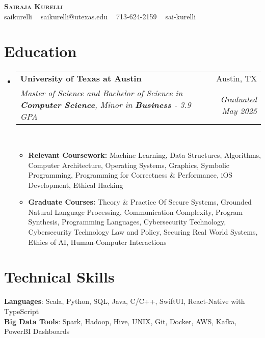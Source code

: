 \documentclass[letterpaper,11pt]{article}
\makeatletter
\newcommand{\resumeItem}[1]{
  \item\small{
    {#1 \vspace{-2pt}}
  }
}
\newcommand{\resumeSubLineheading}[6]{
  \vspace{-2pt}\item
    \begin{tabular*}{0.97\textwidth}[t]{l@{\extracolsep{\fill}}r}
      \textbf{#1} & #2 \\
      \textit{\small#3} & \textit{\small #5} \\
    \end{tabular*}\vspace{-7pt}
}
\newcommand{\resumeSubHeadingListStart}{\begin{itemize}[leftmargin=0.15in, label={}]}
\newcommand{\resumeSubHeadingListEnd}{\end{itemize}}
\newcommand{\resumeItemListStart}{\begin{itemize}}
\newcommand{\resumeItemListEnd}{\end{itemize}\vspace{-5pt}}
\makeatother
\begin{document}

\begin{center}
  \textbf{\huge \scshape Sairaja Kurelli} \\ \vspace{3pt}
  \small \faGithub{} saikurelli $\;\;$ \faEnvelope{} saikurelli@utexas.edu $\;\;$ \faPhone{} 713-624-2159 $\;\;$\faLinkedin{} sai-kurelli
\end{center}


\section{Education}
\resumeSubHeadingListStart
\resumeSubLineheading
{University of Texas at Austin}{Austin, TX}
{Master of Science and Bachelor of Science in \textbf{Computer Science}, Minor in \textbf{Business} - 3.9 GPA}
{}{Graduated May 2025} {}
\\
\resumeItemListStart
\resumeItem{\small \textbf{Relevant Coursework:} Machine Learning, Data Structures, Algorithms,
  Computer Architecture, Operating Systems, Graphics, Symbolic Programming, Programming for Correctness \& Performance,
  iOS Development, Ethical Hacking} %
\resumeItem{\small \textbf{Graduate Courses:} Theory \& Practice Of Secure Systems, Grounded Natural Language Processing, Communication Complexity, Program Synthesis, Programming Languages, Cybersecurity Technology, Cybersecurity Technology Law and Policy, Securing Real World Systems, Ethics of AI, Human-Computer Interactions}
\resumeItemListEnd
\resumeSubHeadingListEnd


\section{Technical Skills}
\begin{itemize}[leftmargin=0.15in, label={}]
  \small{\item{
        \textbf{Languages}{: Scala, Python, SQL, Java, C/C++, SwiftUI, React-Native with TypeScript} \\
        \textbf{Big Data Tools}{: Spark, Hadoop, Hive, UNIX, Git, Docker, AWS, Kafka, PowerBI Dashboards} \\
        }}
\end{itemize}
\end{document}
